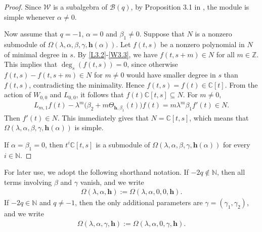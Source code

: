 \documentclass[a4paper]{amsart}
\numberwithin{equation}{section}
\begin{document}
 \begin{proof}
Since $\mathcal{W}$ is a subalgebra of $\mathcal{B}(q)$, by Proposition 3.1 in \cite{CG17}, the module is simple whenever $\alpha \neq 0$.

Now assume that $q=-1$, $\alpha=0$ and $\beta_{1}\neq 0$. Suppose that $ N $ is a nonzero submodule of $\Omega(\lambda,\alpha,\beta,\gamma,\mathbf h(\alpha))$. Let $f(t,s)$ be a nonzero polynomial in $N$ of minimal degree in $s$. By \eqref{L3.2}-\eqref{W3.3}, we have 
$f(t,s+m)\in N$ for all $m\in\mathbb{Z}$. This implies that $\deg_{s}(f(t,s))=0$, since otherwise $f(t,s)-f(t,s+m)\in N$ for $m\neq 0$ would have smaller degree in $s$ than $f(t,s)$, contradicting the minimality. Hence $f(t,s)=f(t)\in \mathbb{C}[t]$. From the action of $W_{0,0}$ and $L_{0,0}$, it follows that $f(t)\mathbb{C}[t,s]\subseteq N$. For $m\neq0$,
\begin{align*}
L_{m,1}f(t)-\lambda^m\bigl(\beta_2+m\Theta_{\mathbf h,\beta_1}(t)\bigr)f(t)
=m\lambda^m\beta_1f'(t)\in N.
\end{align*}
Then $f'(t)\in N$. This immediately gives that $N=\mathbb{C}[t,s]$, which means that $\Omega(\lambda,\alpha,\beta,\gamma,\mathbf h(\alpha))$ is simple.

If $\alpha=\beta_{1}=0$, then $t^{i}\mathbb{C}[t,s]$ is a submodule of $\Omega(\lambda,\alpha,\beta,\gamma,\mathbf h(\alpha))$ for every $i\in\mathbb{N}$.
 \end{proof}
For later use, we adopt the following shorthand notation. If
$-2q\notin\mathbb N$, then all terms involving $\beta$ and $\gamma$
vanish, and we write
\begin{align*}
\Omega(\lambda,\alpha,\mathbf h)
:=\Omega(\lambda,\alpha,0,0,\mathbf h).
\end{align*}
If $-2q\in\mathbb N$ and $q\neq -1$, then the only additional
parameters are $\gamma=(\gamma_1,\gamma_2)$, and we write
\begin{align*}
\Omega(\lambda,\alpha,\gamma,\mathbf h)
:=\Omega(\lambda,\alpha,0,\gamma,\mathbf h).
\end{align*}
\end{document}
